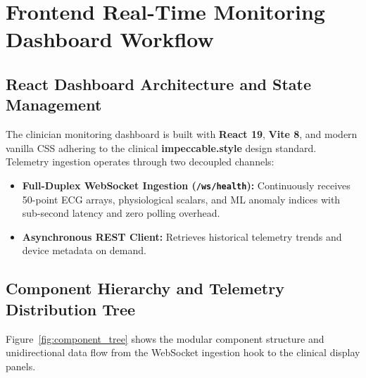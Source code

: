 \documentclass[12pt]{article}
\begin{document}
\section{Frontend Real-Time Monitoring Dashboard Workflow}
\label{sec:frontend_workflow}

\subsection{React Dashboard Architecture and State Management}
The clinician monitoring dashboard is built with \textbf{React 19}, \textbf{Vite 8}, and modern vanilla CSS adhering to the clinical \textbf{impeccable.style} design standard. Telemetry ingestion operates through two decoupled channels:
\begin{itemize}[itemsep=2pt, parsep=0pt, topsep=1.5pt]
    \item \textbf{Full-Duplex WebSocket Ingestion (\texttt{/ws/health}):} Continuously receives 50-point ECG arrays, physiological scalars, and ML anomaly indices with sub-second latency and zero polling overhead.
    \item \textbf{Asynchronous REST Client:} Retrieves historical telemetry trends and device metadata on demand.
\end{itemize}

\subsection{Component Hierarchy and Telemetry Distribution Tree}
Figure~\ref{fig:component_tree} shows the modular component structure and unidirectional data flow from the WebSocket ingestion hook to the clinical display panels.
\end{document}
